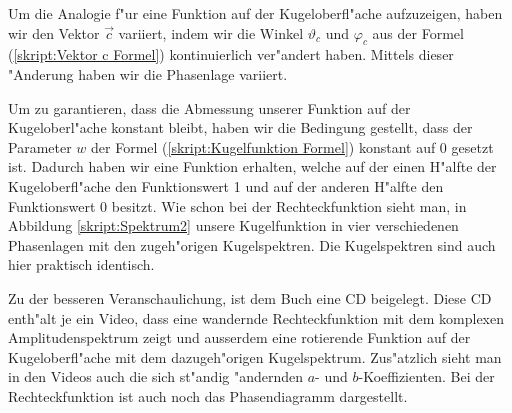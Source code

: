 \begin{refsection}
Um die Analogie f"ur eine Funktion auf der Kugeloberfl"ache aufzuzeigen, 
haben wir den Vektor $\vec{c}$ variiert, indem wir die Winkel $\vartheta_c$
und $\varphi_c$ aus der Formel (\ref{skript:Vektor c Formel}) 
kontinuierlich ver"andert haben. 
Mittels dieser "Anderung haben wir die Phasenlage variiert.
 
Um zu garantieren, dass die Abmessung unserer Funktion auf der 
Kugeloberl"ache konstant bleibt, haben wir die Bedingung gestellt,
dass der Parameter $w$ der Formel (\ref{skript:Kugelfunktion Formel}) 
konstant auf 0 gesetzt ist. 
Dadurch haben wir eine Funktion erhalten, welche auf der einen 
H"alfte der Kugeloberfl"ache den Funktionswert 1 und auf der 
anderen H"alfte den Funktionswert 0 besitzt. 
Wie schon bei der Rechteckfunktion sieht man, in Abbildung 
\ref{skript:Spektrum2}  
unsere Kugelfunktion in vier verschiedenen Phasenlagen mit den 
zugeh"origen Kugelspektren.
Die Kugelspektren sind auch hier praktisch identisch. 

Zu der besseren Veranschaulichung, ist dem Buch eine CD 
beigelegt.
Diese CD enth"alt je ein Video, dass eine wandernde 
Rechteckfunktion mit dem komplexen Amplitudenspektrum zeigt und
ausserdem eine rotierende Funktion auf der Kugeloberfl"ache mit 
dem  dazugeh"origen Kugelspektrum. 
Zus"atzlich sieht man in den Videos auch
die sich st"andig "andernden $a$- und $b$-Koeffizienten. Bei der 
Rechteckfunktion ist auch noch das Phasendiagramm dargestellt.


\end{refsection}
